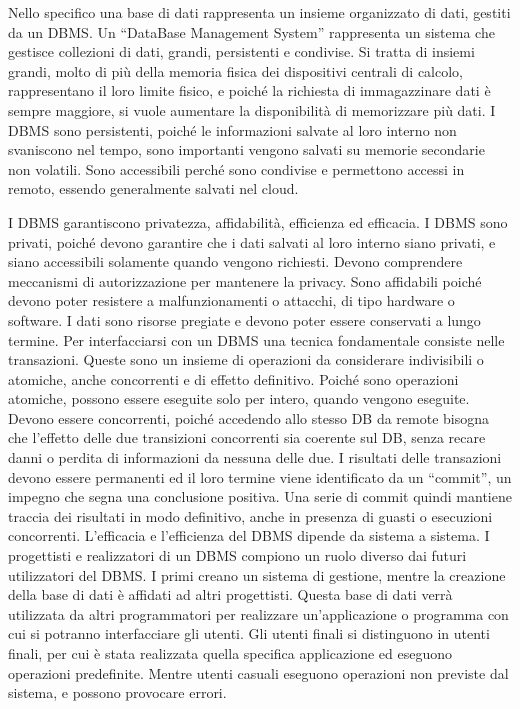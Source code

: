 \documentclass{article}
\numberwithin{equation}{subsection}
\begin{document}
Nello specifico una base di dati rappresenta un insieme organizzato di dati, gestiti da un DBMS. 
Un ``DataBase Management System'' rappresenta un sistema che gestisce collezioni di dati, grandi, persistenti e condivise. 
Si tratta di insiemi grandi, molto di più della memoria fisica dei dispositivi centrali di calcolo, rappresentano il loro limite fisico, e poiché la richiesta di immagazzinare dati 
è sempre maggiore, si vuole aumentare la disponibilità di memorizzare più dati. 
I DBMS sono persistenti, poiché le informazioni salvate al loro interno non svaniscono nel tempo, sono importanti vengono salvati su memorie secondarie non volatili. 
Sono accessibili perché sono condivise e permettono accessi in remoto, essendo generalmente salvati nel cloud. 

I DBMS garantiscono privatezza, affidabilità, efficienza ed efficacia. I DBMS sono privati, poiché devono garantire che i dati salvati al loro interno siano privati, 
e siano accessibili solamente quando vengono richiesti. Devono comprendere meccanismi di autorizzazione per mantenere la privacy. 
Sono affidabili poiché devono poter resistere a malfunzionamenti o attacchi, di tipo hardware o software. I dati sono risorse pregiate e devono poter essere conservati 
a lungo termine. 
Per interfacciarsi con un DBMS una tecnica fondamentale consiste nelle transazioni. Queste sono un insieme di operazioni da considerare indivisibili o atomiche, anche 
concorrenti e di effetto definitivo. Poiché sono operazioni atomiche, possono essere eseguite solo per intero, quando vengono eseguite. Devono essere concorrenti, poiché 
accedendo allo stesso DB da remote bisogna che l'effetto delle due transizioni concorrenti sia coerente sul DB, senza recare danni o perdita di informazioni da nessuna delle 
due. 
I risultati delle transazioni devono essere permanenti ed il loro termine viene identificato da un ``commit'', un impegno che segna una conclusione positiva. Una serie 
di commit quindi mantiene traccia dei risultati in modo definitivo, anche in presenza di guasti o esecuzioni concorrenti. 
L'efficacia e l'efficienza del DBMS dipende da sistema a sistema. 
I progettisti e realizzatori di un DBMS compiono un ruolo diverso dai futuri utilizzatori del DBMS. I primi creano un sistema di gestione, mentre la creazione della base 
di dati è affidati ad altri progettisti. Questa base di dati verrà utilizzata da altri programmatori per realizzare un'applicazione o programma con cui si potranno 
interfacciare gli utenti. Gli utenti finali si distinguono in utenti finali, per cui è stata realizzata quella specifica applicazione ed eseguono operazioni 
predefinite. Mentre utenti casuali eseguono operazioni non previste dal sistema, e possono provocare errori. 
\end{document}
